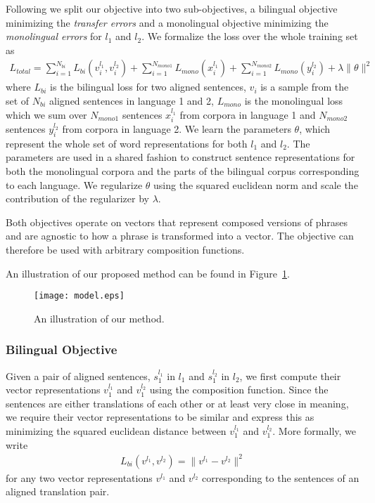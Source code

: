 \documentclass{article} \usepackage{iclr2015,times}
\begin{document}
Following \citet{klementiev2012inducing} we split our objective into two
sub-objectives, a bilingual objective minimizing the \emph{transfer errors} and
a monolingual objective minimizing the \emph{monolingual errors} for $l_1$ and
$l_2$. We formalize the loss over the whole training set as
\begin{align}
    \label{math:objective}
    L_{total} = \sum_{i=1}^{N_{bi}} L_{bi}(v_i^{l_1}, v_i^{l_2}) +
    \sum_{i=1}^{N_{mono1}} L_{mono} (x_i^{l_1}) +
    \sum_{i=1}^{N_{mono2}} L_{mono} (y_i^{l_2}) +
    \lambda \| \theta \|^2
\end{align}
where $L_{bi}$ is the bilingual loss for two aligned sentences, $v_i$ is a 
sample from the set of $N_{bi}$ aligned sentences in language 1 and 2,
$L_{mono}$ is the monolingual loss which we sum over $N_{mono1}$ sentences
$x_i^{l_1}$ from corpora in language 1 and $N_{mono2}$ sentences $y_i^{l_2}$
from corpora in language 2. We learn the parameters $\theta$, which 
represent the whole set of word representations for both $l_1$ and $l_2$.
The parameters are used in a shared fashion to construct sentence 
representations for both the monolingual corpora and the parts of the 
bilingual corpus corresponding to each language.
We regularize $\theta$ using the squared euclidean norm and scale the
contribution of the regularizer by $\lambda$.

Both objectives operate on vectors that represent composed versions
of phrases and are agnostic to how a phrase is transformed into a vector.
The objective can therefore be used with arbitrary composition functions.

An illustration of our proposed method can be found in 
Figure~\ref{fig:all-illustration}.

\begin{figure}[t]
    \begin{center}
        \texttt{[image: model.eps]}
    \end{center}
    \caption{An illustration of our method.}
    \label{fig:all-illustration}
\end{figure}

\subsubsection{Bilingual Objective}

Given a pair of aligned sentences, $s_1^{l_1}$ in $l_1$
and $s_1^{l_2}$ in $l_2$, we first compute their vector representations
$v_1^{l_1}$  and $v_1^{l_2}$ using the composition function.
Since the sentences are either translations of each other or at least
very close in meaning, we require their vector representations to be similar
and express this as minimizing the squared euclidean
distance between $v_1^{l_1}$ and $v_1^{l_2}$.
More formally, we write
\begin{align}
    L_{bi}(v^{l_1}, v^{l_2}) = \| v^{l_1} - v^{l_2} \|^2
\end{align}
for any two vector representations $v^{l_1}$ and $v^{l_2}$ corresponding to
the sentences of an aligned translation pair.
\end{document}
